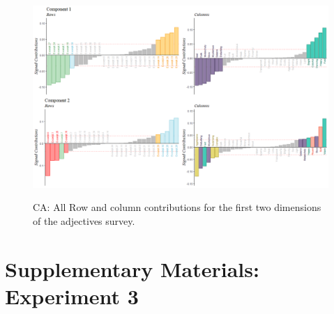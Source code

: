 \documentclass[
]{article}
\begin{document}
\begin{figure}   
  \centering  
  \caption{CA: All Row and column contributions for the first two dimensions of the adjectives survey.}
    \includegraphics{./supmatsimgs/acontsordered.png}
  \label{fig:aconts}
\end{figure}


\hypertarget{supplementary-materials-experiment-3}{%
\section{Supplementary Materials: Experiment
3}\label{supplementary-materials-experiment-3}}
\end{document}
